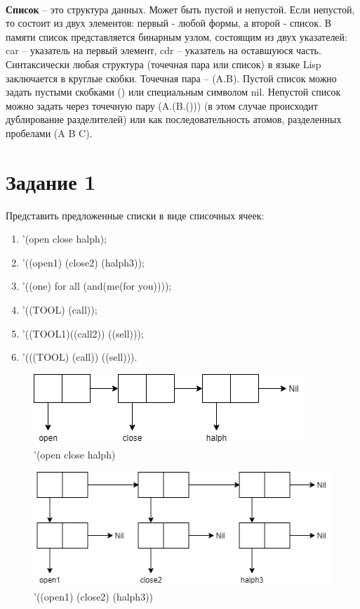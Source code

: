 \documentclass[a4paper, 12pt]{article}
\begin{document}
	\\ \hspace*{5mm} \textbf{Список} – это структура данных. Может быть пустой и непустой. Если непустой,
	то состоит из двух элементов: первый - любой формы, а второй - список.
	В памяти список представляется бинарным узлом, состоящим из двух
	указателей: car – указатель на первый элемент, cdr – указатель на оставшуюся
	часть.
	\\ \hspace*{5mm} Синтаксически любая структура (точечная пара или список) в языке Lisp
	заключается в круглые скобки. Точечная пара – (A.B). Пустой список можно
	задать пустыми скобками () или специальным символом nil. Непустой список
	можно задать через точечную пару (A.(B.())) (в этом случае происходит
	дублирование разделителей) или как последовательность атомов, разделенных
	пробелами (A B C).
	


\section{Задание 1}
Представить предложенные списки в виде списочных ячеек:
\begin{enumerate}
	\item '(open close halph);
	\item '((open1) (close2) (halph3));
	\item '((one) for all (and(me(for you))));
	\item '((TOOL) (call));
	\item '((TOOL1)((call2)) ((sell)));
	\item '(((TOOL) (call)) ((sell))).
\end{enumerate}
\clearpage
\newpage
\begin{figure}[h!]
	\centering \includegraphics[scale=0.8]{1}
	\centering\caption{'(open close halph)}
\end{figure}

\begin{figure}[h!]
	\centering \includegraphics[scale=0.8]{2}
	\centering\caption{'((open1) (close2) (halph3))}
\end{figure}
\end{document}
